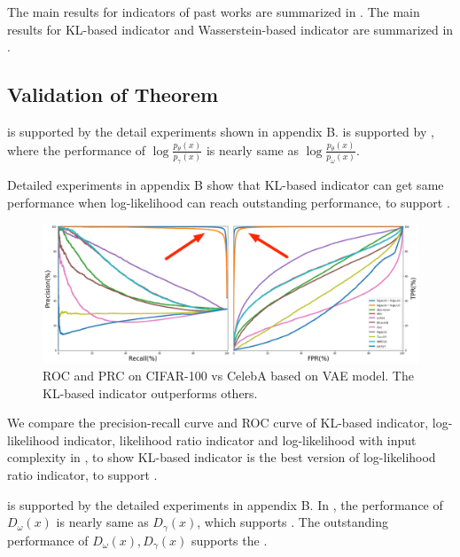 \documentclass[letterpaper]{article} %
\begin{document}
The main results for indicators of past works are summarized in . The main results for KL-based indicator and Wasserstein-based indicator are summarized in . 

\subsection{Validation of Theorem}

 is supported by the detail experiments shown in appendix B.  is supported by , where the performance of $\log \frac{p_\theta(x)}{p_\gamma(x)}$ is nearly same as $\log \frac{p_\theta(x)}{p_\omega(x)}$. 

Detailed experiments in appendix B show that KL-based indicator can get same performance when log-likelihood can reach outstanding performance, to support . 

\begin{figure}[t]
	\includegraphics[width=0.9\columnwidth]{roc_prc}
	\caption{ROC and PRC on CIFAR-100 vs CelebA based on VAE model. The KL-based indicator outperforms others. }
	\label{fig5}
\end{figure}

We compare the precision-recall curve and ROC curve of KL-based indicator, log-likelihood indicator, likelihood ratio indicator and log-likelihood with input complexity in , to show KL-based indicator is the best version of log-likelihood ratio indicator, to support . 

 is supported by the detailed experiments in appendix B. In , the performance of $D_\omega(x)$ is nearly same as $D_\gamma(x)$, which supports . The outstanding performance of $D_\omega(x), D_\gamma(x)$ supports the . 
\end{document}
